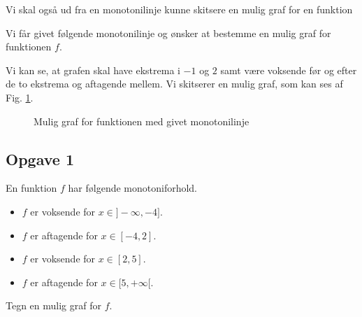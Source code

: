 Vi skal også ud fra en monotonilinje kunne skitsere en mulig graf for en funktion
\begin{exa}
	Vi får givet følgende monotonilinje og ønsker at bestemme en mulig graf for funktionen $f$. 
	\begin{center}
	\end{center}
	Vi kan se, at grafen skal have ekstrema i $-1$ og $2$ samt være voksende før og efter de to ekstrema og aftagende mellem. Vi skitserer en mulig graf, som kan ses af Fig. \ref{fig:skitse}.
	\begin{figure}[H]
		\centering
		\caption{Mulig graf for funktionen med givet monotonilinje}
		\label{fig:skitse}
	\end{figure}
\end{exa}

\newpage

\subsection*{Opgave 1}
En funktion $f$ har følgende monotoniforhold.
\begin{itemize}
	\item[$\cdot$] $f$ er voksende for $x \in ]-\infty,-4]$.
	\item[$\cdot$] $f$ er aftagende for $x \in [-4,2]$.
	\item[$\cdot$] $f$ er voksende for $x \in [2,5]$.
	\item[$\cdot$] $f$ er aftagende for $x \in [5,+\infty[$. 
\end{itemize}
Tegn en mulig graf for $f$.

